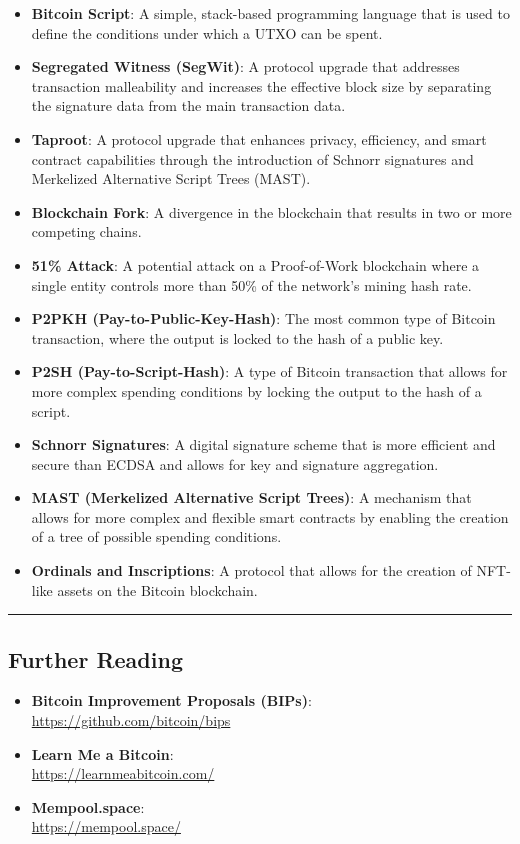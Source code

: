 \begin{itemize}
	\tightlist
	\item
	\textbf{Bitcoin Script}: A simple, stack-based programming language
	that is used to define the conditions under which a UTXO can be spent.
	\item
	\textbf{Segregated Witness (SegWit)}: A protocol upgrade that
	addresses transaction malleability and increases the effective block
	size by separating the signature data from the main transaction data.
	\item
	\textbf{Taproot}: A protocol upgrade that enhances privacy,
	efficiency, and smart contract capabilities through the introduction
	of Schnorr signatures and Merkelized Alternative Script Trees (MAST).
	\item
	\textbf{Blockchain Fork}: A divergence in the blockchain that results
	in two or more competing chains.
	\item
	\textbf{51\% Attack}: A potential attack on a Proof-of-Work blockchain
	where a single entity controls more than 50\% of the network's mining
	hash rate.
	\item
	\textbf{P2PKH (Pay-to-Public-Key-Hash)}: The most common type of
	Bitcoin transaction, where the output is locked to the hash of a
	public key.
	\item
	\textbf{P2SH (Pay-to-Script-Hash)}: A type of Bitcoin transaction that
	allows for more complex spending conditions by locking the output to
	the hash of a script.
	\item
	\textbf{Schnorr Signatures}: A digital signature scheme that is more
	efficient and secure than ECDSA and allows for key and signature
	aggregation.
	\item
	\textbf{MAST (Merkelized Alternative Script Trees)}: A mechanism that
	allows for more complex and flexible smart contracts by enabling the
	creation of a tree of possible spending conditions.
	\item
	\textbf{Ordinals and Inscriptions}: A protocol that allows for the
	creation of NFT-like assets on the Bitcoin blockchain.
\end{itemize}

\begin{center}\rule{0.5\linewidth}{0.5pt}\end{center}

\subsection{Further Reading}\label{further-reading}

\begin{itemize}
	\tightlist
	\item
	\textbf{Bitcoin Improvement Proposals (BIPs)}:\\
	\url{https://github.com/bitcoin/bips}
	\item
	\textbf{Learn Me a Bitcoin}: \\ 
	\url{https://learnmeabitcoin.com/}
	\item
	\textbf{Mempool.space}: \\
	\url{https://mempool.space/}
\end{itemize}